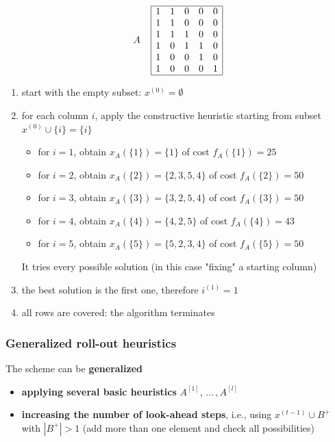 $$
A \;\;\;\;
\begin{array}{| c c c c c |}
	\hline
	1 & 1 & 0 & 0 & 0 \\
	1 & 1 & 0 & 0 & 0 \\
	1 & 1 & 1 & 0 & 0 \\
	1 & 0 & 1 & 1 & 0 \\
	1 & 0 & 0 & 1 & 0 \\
	1 & 0 & 0 & 0 & 1 \\
	\hline
\end{array}
$$

\begin{enumerate}
	\item start with the empty subset: $x^{(0)} = \emptyset$
	
	\item for each column $i$, apply the constructive heuristic starting from subset $x^{(0)} \cup \{i\} = \{i\}$
	\begin{itemize}
		\item for $i = 1$, obtain $x_A (\{1\}) = \{1\}$ of cost $f_A (\{1\}) = 25$
		\item for $i = 2$, obtain $x_A (\{2\}) = \{2, 3, 5, 4\}$ of cost $f_A (\{2\}) = 50$
		\item for $i = 3$, obtain $x_A (\{3\}) = \{3, 2, 5, 4\}$ of cost $f_A (\{3\}) = 50$
		\item for $i = 4$, obtain $x_A (\{4\}) = \{4, 2, 5\}$ of cost $f_A (\{4\}) = 43$
		\item for $i = 5$, obtain $x_A (\{5\}) = \{5, 2, 3, 4\}$ of cost $f_A (\{5\}) = 50$
	\end{itemize}
	It tries every possible solution (in this case "fixing" a starting column)
	
	\item the best solution is the first one, therefore $i^{(1)} = 1$
	
	\item all rows are covered: the algorithm terminates
\end{enumerate}

\newpage

\subsubsection{Generalized roll-out heuristics}
The scheme can be \textbf{generalized}
\begin{itemize}
	\item \textbf{applying several basic heuristics} $A^{[1]}, \, ... \, , A^{[l]}$
	
	\item \textbf{increasing the number of look-ahead steps}, i.e., using $x^{(t−1)} \cup B^+$ with $|B^+| > 1$ (add more than one element and check all possibilities)
\end{itemize}

